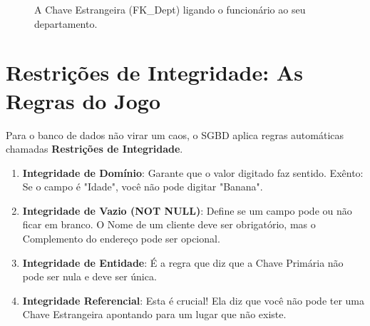 \begin{figure}[H]
    \centering
    \caption{A Chave Estrangeira (FK\_Dept) ligando o funcionário ao seu departamento.}
\end{figure}

\section{Restrições de Integridade: As Regras do Jogo}

Para o banco de dados não virar um caos, o SGBD aplica regras automáticas chamadas \textbf{Restrições de Integridade}.

\begin{enumerate}
    \item \textbf{Integridade de Domínio}: Garante que o valor digitado faz sentido. Exênto: Se o campo é "Idade", você não pode digitar "Banana".
    \item \textbf{Integridade de Vazio (NOT NULL)}: Define se um campo pode ou não ficar em branco. O Nome de um cliente deve ser obrigatório, mas o Complemento do endereço pode ser opcional.
    \item \textbf{Integridade de Entidade}: É a regra que diz que a Chave Primária não pode ser nula e deve ser única.
    \item \textbf{Integridade Referencial}: Esta é crucial! Ela diz que você não pode ter uma Chave Estrangeira apontando para um lugar que não existe.
\end{enumerate}

